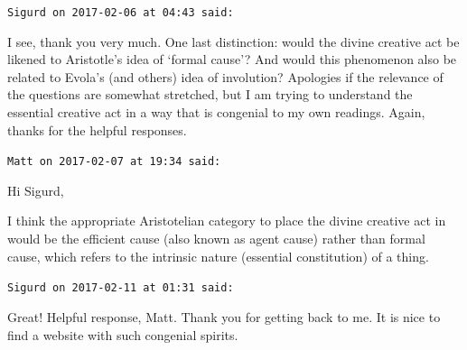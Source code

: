 \begin{footnotesize}
\begin{sffamily}
\hfill

\texttt{Sigurd on 2017-02-06 at 04:43 said:}

I see, thank you very much. One last distinction: would the divine creative act be likened to Aristotle's idea of `formal cause'? And would this phenomenon also be related to Evola's (and others) idea of involution? Apologies if the relevance of the questions are somewhat stretched, but I am trying to understand the essential creative act in a way that is congenial to my own readings. Again, thanks for the helpful responses.

\hfill

\texttt{Matt on 2017-02-07 at 19:34 said:}

Hi Sigurd,

I think the appropriate Aristotelian category to place the divine creative act in would be the efficient cause (also known as agent cause) rather than formal cause, which refers to the intrinsic nature (essential constitution) of a thing.

\hfill

\texttt{Sigurd on 2017-02-11 at 01:31 said:}

Great! Helpful response, Matt. Thank you for getting back to me. It is nice to find a website with such congenial spirits.

\end{sffamily}
\end{footnotesize}

